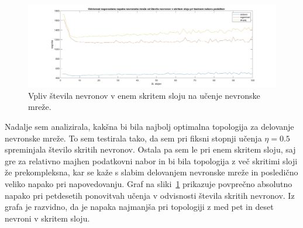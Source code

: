 \documentclass[mat1]{fmfdelo}
\begin{document}
\begin{figure}[!ht]
	\centering
	\includegraphics[width=1\textwidth]{lay.jpg}
	\caption{Vpliv števila nevronov v enem skritem sloju na učenje nevronske mreže.}
	\label{fig:lay}
\end{figure}
Nadalje sem analizirala, kakšna bi bila najbolj optimalna topologija za delovanje nevronske mreže. To sem testirala tako, da sem pri fiksni stopnji učenja $\eta = 0.5$ spreminjala število skritih nevronov. Ostala pa sem le pri enem skritem sloju, saj gre za relativno majhen podatkovni nabor in bi bila topologija z več skritimi sloji že prekompleksna, kar se kaže s slabim delovanjem nevronske mreže in posledično veliko napako pri napovedovanju. 
Graf na sliki~\ref{fig:lay} prikazuje povprečno absolutno napako pri petdesetih ponovitvah učenja v odvisnosti števila skritih nevronov. Iz grafa je razvidno, da je napaka najmanjša pri topologiji z med pet in deset nevroni v skritem sloju.
\end{document}
